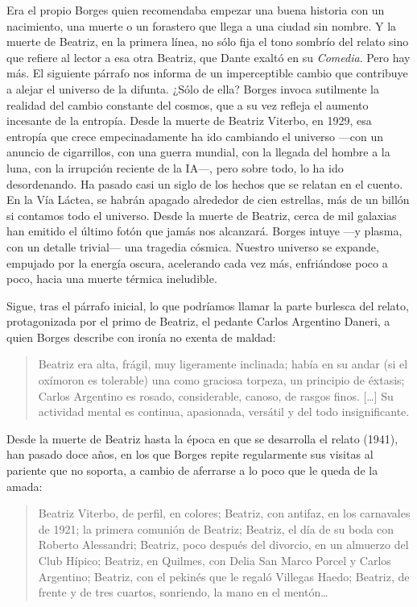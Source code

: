 \documentclass[11pt,a4paper]{article}
\begin{document}
Era el propio Borges quien recomendaba empezar una buena historia con un nacimiento, una muerte o un forastero que llega a una ciudad sin nombre. Y la muerte de Beatriz, en la primera línea, no sólo fija el tono sombrío del relato sino que refiere al lector a esa otra Beatriz, que Dante exaltó en su \emph{Comedia}. Pero hay más. El siguiente párrafo nos informa de un imperceptible cambio que contribuye a alejar el universo de la difunta. ¿Sólo de ella? Borges invoca sutilmente la realidad del cambio constante del cosmos, que a su vez refleja el aumento incesante de la entropía. Desde la muerte de Beatriz Viterbo, en 1929, esa entropía que crece empecinadamente ha ido cambiando el universo ---con un anuncio de cigarrillos, con una guerra mundial, con la llegada del hombre a la luna, con la irrupción reciente de la IA---, pero sobre todo, lo ha ido desordenando. Ha pasado casi un siglo de los hechos que se relatan en el cuento. En la Vía Láctea, se habrán apagado alrededor de cien estrellas, más de un billón si contamos todo el universo. Desde la muerte de Beatriz, cerca de mil galaxias han emitido el último fotón que jamás nos alcanzará. Borges intuye ---y plasma, con un detalle trivial--- una tragedia cósmica. Nuestro universo se expande, empujado por la energía oscura, acelerando cada vez más, enfriándose poco a poco, hacia una muerte térmica ineludible.

Sigue, tras el párrafo inicial, lo que podríamos llamar la parte burlesca del relato, protagonizada por el primo de Beatriz, el pedante Carlos Argentino Daneri, a quien Borges describe con ironía no exenta de maldad:

\begin{quotation}
Beatriz era alta, frágil, muy ligeramente inclinada; había en su andar (si el oxímoron es tolerable) una como graciosa torpeza, un principio de éxtasis; Carlos Argentino es rosado, considerable, canoso, de rasgos finos. […] Su actividad mental es continua, apasionada, versátil y del todo insignificante.
\end{quotation}

Desde la muerte de Beatriz hasta la época en que se desarrolla el relato (1941), han pasado doce años, en los que Borges repite regularmente sus visitas al pariente que no soporta, a cambio de aferrarse a lo poco que le queda de la amada:

\begin{quotation}
Beatriz Viterbo, de perfil, en colores; Beatriz, con antifaz, en los carnavales de 1921; la primera comunión de Beatriz; Beatriz, el día de su boda con Roberto Alessandri; Beatriz, poco después del divorcio, en un almuerzo del Club Hípico; Beatriz, en Quilmes, con Delia San Marco Porcel y Carlos Argentino; Beatriz, con el pekinés que le regaló Villegas Haedo; Beatriz, de frente y de tres cuartos, sonriendo, la mano en el mentón…
\end{quotation}
\end{document}
